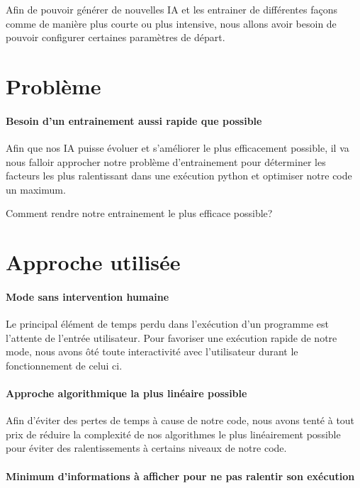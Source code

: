 \documentclass{scrreprt}
\begin{document}
			Afin de pouvoir générer de nouvelles IA et les entrainer de différentes façons comme de manière plus courte ou plus intensive, nous allons avoir besoin de pouvoir configurer certaines paramètres de départ. 
		
		\section{Problème}
			
			\paragraph{Besoin d'un entrainement aussi rapide que possible}
			
			Afin que nos IA puisse évoluer et s'améliorer le plus efficacement possible, il va nous falloir approcher notre problème d'entrainement pour déterminer les facteurs les plus ralentissant dans une exécution python et optimiser notre code un maximum.
			
			Comment rendre notre entrainement le plus efficace possible? 
		
		\section{Approche utilisée}
			\paragraph{Mode sans intervention humaine}
			
			Le principal élément de temps perdu dans l'exécution d'un programme est l'attente de l'entrée utilisateur. Pour favoriser une exécution rapide de notre mode, nous avons ôté toute interactivité avec l'utilisateur durant le fonctionnement de celui ci.
			
			\paragraph{Approche algorithmique la plus linéaire possible}
			
			Afin d'éviter des pertes de temps à cause de notre code, nous avons tenté à tout prix de réduire la complexité de nos algorithmes le plus linéairement possible pour éviter des ralentissements à certains niveaux de notre code.
			
			\paragraph{Minimum d'informations à afficher pour ne pas ralentir son exécution}
			
\end{document}
